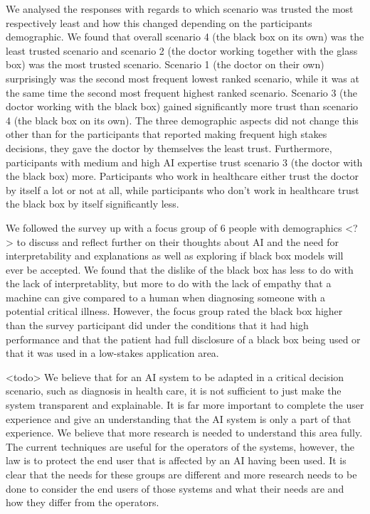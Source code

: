 \documentclass[manuscript,screen,review]{acmart}
\begin{document}
We analysed the responses with regards to which scenario was trusted the most respectively least and how this changed depending on the participants demographic. We found that overall scenario 4 (the black box on its own) was the least trusted scenario and scenario 2 (the doctor working together with the glass box) was the most trusted scenario. Scenario 1 (the doctor on their own) surprisingly was the second most frequent lowest ranked scenario, while it was at the same time the second most frequent highest ranked scenario. Scenario 3 (the doctor working with the black box) gained significantly more trust than scenario 4 (the black box on its own). The three demographic aspects did not change this other than for the participants that reported making frequent high stakes decisions, they gave the doctor by themselves the least trust. Furthermore, participants with medium and high AI expertise trust scenario 3 (the doctor with the black box) more. Participants who work in healthcare either trust the doctor by itself a lot or not at all, while participants who don’t work in healthcare trust the black box by itself significantly less.

We followed the survey up with a focus group of 6 people with demographics <?> to discuss and reflect further on their thoughts about AI and the need for interpretability and explanations as well as exploring if black box models will ever be accepted. We found that the dislike of the black box has less to do with the lack of interpretablity, but more to do with the lack of empathy that a machine can give compared to a human when diagnosing someone with a potential critical illness. However, the focus group rated the black box higher than the survey participant did under the conditions that it had high performance and that the patient had full disclosure of a black box being used or that it was used in a low-stakes application area.


<todo> We believe that for an AI system to be adapted in a critical decision scenario, such as diagnosis in health care, it is not sufficient to just make the system transparent and explainable. It is far more important to complete the user experience and give an understanding that the AI system is only a part of that experience. We believe that more research is needed to understand this area fully.\\
The current techniques are useful for the operators of the systems, however, the law is to protect the end user that is affected by an AI having been used. It is clear that the needs for these groups are different and more research needs to be done to consider the end users of those systems and what their needs are and how they differ from the operators.\\
\end{document}
